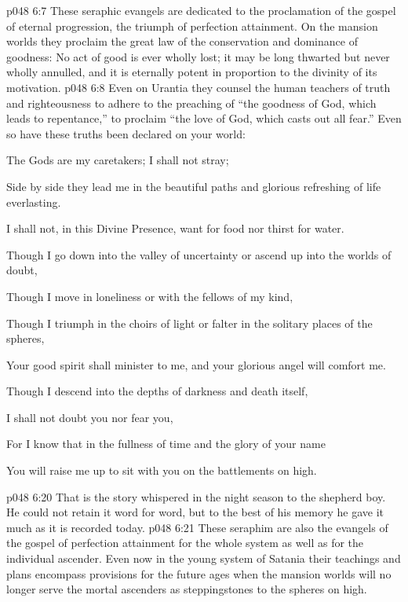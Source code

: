 \pc \vs p048 6:7 These seraphic evangels are dedicated to the proclamation of the gospel of eternal progression, the triumph of perfection attainment. On the mansion worlds they proclaim the great law of the conservation and dominance of goodness: No act of good is ever wholly lost; it may be long thwarted but never wholly annulled, and it is eternally potent in proportion to the divinity of its motivation.
\vs p048 6:8 Even on Urantia they counsel the human teachers of truth and righteousness to adhere to the preaching of “the goodness of God, which leads to repentance,” to proclaim “the love of God, which casts out all fear.” Even so have these truths been declared on your world:
\begin{quoting}[vskip=\baselineskip,leftmargin=4ex,rightmargin=2ex]
\setlength{\parindent}{-0.7em}
\hspace*{-1.2em} The Gods are my caretakers; I shall not stray;\par
Side by side they lead me in the beautiful paths and glorious refreshing of life everlasting.\par
I shall not, in this Divine Presence, want for food nor thirst for water.\par
Though I go down into the valley of uncertainty or ascend up into the worlds of doubt,\par
Though I move in loneliness or with the fellows of my kind,\par
Though I triumph in the choirs of light or falter in the solitary places of the spheres,\par
Your good spirit shall minister to me, and your glorious angel will comfort me.\par
Though I descend into the depths of darkness and death itself,\par
I shall not doubt you nor fear you,\par
For I know that in the fullness of time and the glory of your name\par
You will raise me up to sit with you on the battlements on high.\par
\end{quoting}
\pc \vs p048 6:20 That is the story whispered in the night season to the shepherd boy. He could not retain it word for word, but to the best of his memory he gave it much as it is recorded today.
\vs p048 6:21 These seraphim are also the evangels of the gospel of perfection attainment for the whole system as well as for the individual ascender. Even now in the young system of Satania their teachings and plans encompass provisions for the future ages when the mansion worlds will no longer serve the mortal ascenders as steppingstones to the spheres on high.
